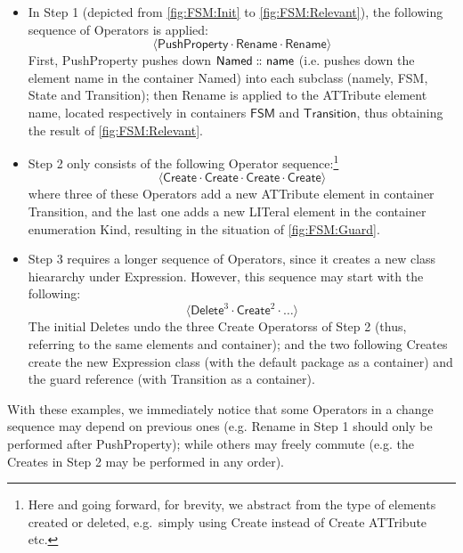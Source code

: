 \begin{itemize}
	\item In Step 1 (depicted from \cref{fig:FSM:Init} to \cref{fig:FSM:Relevant}),
	the following sequence of \textsf{Operator}s is applied:
	$$\langle \mathsf{PushProperty} \cdot \mathsf{Rename} \cdot \mathsf{Rename} \rangle$$
	First, \textsf{PushProperty} pushes down $\mathsf{Named} \,\colon\!\!\!\colon \mathsf{name}$
	(i.e. pushes down the \textsf{element} \textsf{name} in the \textsf{container}
	\textsf{Named})
	into each subclass (namely, \textsf{FSM}, \textsf{State} and \textsf{Transition});
	then \textsf{Rename} is applied to the \textsf{ATT}ribute \textsf{element} 
	\textsf{name}, located respectively in \textsf{container}s $\mathsf{FSM}$ and 
	$\mathsf{Transition}$, thus obtaining the result of \cref{fig:FSM:Relevant}.
	
	\item Step 2 only consists of the following \textsf{Operator} sequence:\footnote{Here and going forward, for brevity, we abstract from the \textsf{type} of elements created or deleted, e.g.~simply using \textsf{Create} instead of \textsf{Create ATTribute} etc.}
	$$\langle \mathsf{Create} \cdot \mathsf{Create} \cdot \mathsf{Create} \cdot \mathsf{Create} \rangle$$
	where three of these \textsf{Operator}s add a new \textsf{ATT}ribute \textsf{element}
	in \textsf{container} \textsf{Transition}, and the last one adds a new 
	\textsf{LIT}eral \textsf{element} in the \textsf{container} enumeration \textsf{Kind},
	resulting in the situation of \cref{fig:FSM:Guard}.
	
	\item Step 3 requires a longer sequence of \textsf{Operator}s, since it creates
	a new class hieararchy under \textsf{Expression}. However, this sequence may
	start with the following:
	$$\langle \mathsf{Delete}^3 \cdot \mathsf{Create}^2 \cdot \ldots \rangle$$
	The initial \textsf{Delete}s undo the three \textsf{Create} \textsf{Operators}s 
	of Step 2
	(thus, referring to the same \textsf{element}s and \textsf{container}); and
	the two following \textsf{Create}s create the new \textsf{Expression} class
	(with the default package as a \textsf{container}) and the \textsf{guard}
	reference (with \textsf{Transition} as a \textsf{container}).
\end{itemize}
With these examples, we immediately notice that some \textsf{Operator}s
in a change sequence may depend on previous ones (e.g. \textsf{Rename}
in Step 1 should only be performed after \textsf{PushProperty}); while others
may freely commute (e.g. the \textsf{Create}s in Step 2 may be performed in any 
order).